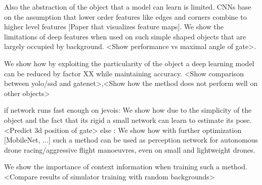 Also the abstraction of the object that a model can learn is limited. CNNs base on the assumption that lower order features like edges and corners combine to higher level features [Paper that visualizes feature maps]. We show the limitations of deep features when used on such simple shaped objects that are largely occupied by background. <Show performance vs maximal angle of gate>.

We show how by exploiting the particularity of the object a deep learning model can be reduced by factor XX while maintaining accuracy. <Show comparison between yolo/ssd and gatenet>,<Show how the method does not perform well on other objects>

if network runs fast enough on jevois:
	We show how due to the simplicity of the object and the fact that its rigid a small network can learn to estimate its pose. <Predict 3d position of gate>
else :
	We show how with further optimization [MobileNet, ...] such a method can be used as perception network for autonomous drone racing/aggressive flight manoeuvres, even on small and lightweight drones.

We show the importance of context information when training such a method. <Compare results of simulator training with random backgrounds>




